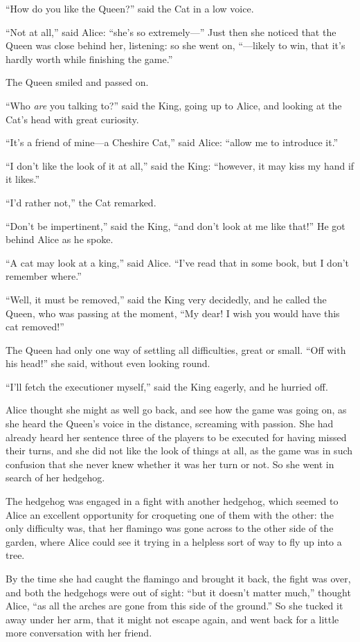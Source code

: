 \documentclass[11pt,openany,oneside]{book}
\begin{document}
“How do you like the Queen?” said the Cat in a low voice. 

“Not at all,” said Alice: “she’s so extremely—” Just then she noticed that the Queen was close behind her, listening: so she went on, “—likely to win, that it’s hardly worth while finishing the game.” 

The Queen smiled and passed on. 

“Who {\em are\/} you talking to?” said the King, going up to Alice, and looking at the Cat’s head with great curiosity. 

“It’s a friend of mine—a Cheshire Cat,” said Alice: “allow me to introduce it.” 

“I don’t like the look of it at all,” said the King: “however, it may kiss my hand if it likes.” 

“I’d rather not,” the Cat remarked. 

“Don’t be impertinent,” said the King, “and don’t look at me like that!” He got behind Alice as he spoke. 

“A cat may look at a king,” said Alice. “I’ve read that in some book, but I don’t remember where.” 

“Well, it must be removed,” said the King very decidedly, and he called the Queen, who was passing at the moment, “My dear! I wish you would have this cat removed!” 

The Queen had only one way of settling all difficulties, great or small. “Off with his head!” she said, without even looking round. 

“I’ll fetch the executioner myself,” said the King eagerly, and he hurried off. 

Alice thought she might as well go back, and see how the game was going on, as she heard the Queen’s voice in the distance, screaming with passion. She had already heard her sentence three of the players to be executed for having missed their turns, and she did not like the look of things at all, as the game was in such confusion that she never knew whether it was her turn or not. So she went in search of her hedgehog. 

The hedgehog was engaged in a fight with another hedgehog, which seemed to Alice an excellent opportunity for croqueting one of them with the other: the only difficulty was, that her flamingo was gone across to the other side of the garden, where Alice could see it trying in a helpless sort of way to fly up into a tree. 

By the time she had caught the flamingo and brought it back, the fight was over, and both the hedgehogs were out of sight: “but it doesn’t matter much,” thought Alice, “as all the arches are gone from this side of the ground.” So she tucked it away under her arm, that it might not escape again, and went back for a little more conversation with her friend. 
\end{document}
